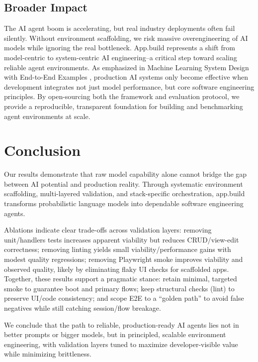 \documentclass{article}
\begin{document}
\subsection{Broader Impact}

The AI agent boom is accelerating, but real industry deployments often fail silently. Without environment scaffolding, we risk massive overengineering of AI models while ignoring the real bottleneck. App.build represents a shift from model-centric to system-centric AI engineering--a critical step toward scaling reliable agent environments. As emphasized in Machine Learning System Design with End-to-End Examples \citep{babushkin2025machine}, production AI systems only become effective when development integrates not just model performance, but core software engineering principles. By open-sourcing both the framework and evaluation protocol, we provide a reproducible, transparent foundation for building and benchmarking agent environments at scale.

\section{Conclusion}

Our results demonstrate that raw model capability alone cannot bridge the gap between AI potential and production reality. Through systematic environment scaffolding, multi-layered validation, and stack-specific orchestration, app.build transforms probabilistic language models into dependable software engineering agents.

Ablations indicate clear trade-offs across validation layers: removing unit/handlers tests increases apparent viability but reduces CRUD/view-edit correctness; removing linting yields small viability/performance gains with modest quality regressions; removing Playwright smoke improves viability and observed quality, likely by eliminating flaky UI checks for scaffolded apps. Together, these results support a pragmatic stance: retain minimal, targeted smoke to guarantee boot and primary flows; keep structural checks (lint) to preserve UI/code consistency; and scope E2E to a ``golden path'' to avoid false negatives while still catching session/flow breakage.

We conclude that the path to reliable, production-ready AI agents lies not in better prompts or bigger models, but in principled, scalable environment engineering, with validation layers tuned to maximize developer-visible value while minimizing brittleness.
\end{document}
